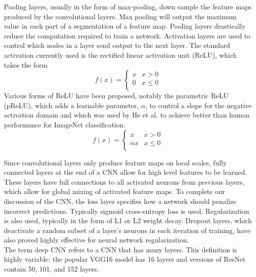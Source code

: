 \documentclass[pageno]{jpaper}
\begin{document}
Pooling layers, usually in the form of max-pooling, down sample the feature maps produced by the convolutional layers. Max pooling will output the maximum value in each part of a segmentation of a feature map. Pooling layers drastically reduce the computation required to train a network. Activation layers are used to control which nodes in a layer send output to the next layer. The standard activation currently used is the rectified linear activation unit (ReLU), which takes the form
\begin{equation}
	f(x) = \begin{cases}
	   x & x > 0 \\
	   0 & x\leq 0 \\
     \end{cases}
\end{equation}
Various forms of ReLU have been proposed, notably the parametric ReLU (pReLU), which adds a learnable parameter, $\alpha$, to control a slope for the negative activation domain and which was used by He et al. to achieve better than human performance for ImageNet classification.\cite{he2016deep}
\begin{equation}
	f(x) = \begin{cases}
	   x & x > 0 \\
	   \alpha x & x \leq 0 \\
     \end{cases}
\end{equation}

Since convolutional layers only produce feature maps on local scales, fully connected layers at the end of a CNN allow for high level features to be learned. These layers have full connections to all activated neurons from previous layers, which allow for global mixing of activated feature maps. To complete our discussion of the CNN, the loss layer specifies how a network should penalize incorrect predictions. Typically sigmoid cross-entropy loss is used. Regularization is also used, typically in the form of L1 or L2 weight decay. Dropout layers, which deactivate a random subset of a layer's neurons in each iteration of training, have also proved highly effective for neural network regularization.\cite{srivastava2014dropout}\\

The term deep CNN refers to a CNN that has many layers. This definition is highly variable: the popular VGG16 model has 16 layers\cite{simonyan2014very} and versions of ResNet contain 50, 101, and 152 layers\cite{he2016deep}.\\
\end{document}
